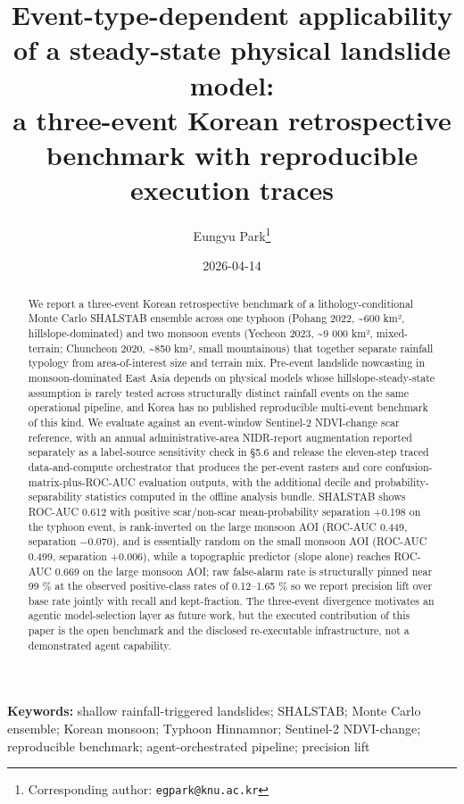 \documentclass[11pt,a4paper]{article}
\title{\bfseries Event-type-dependent applicability of a steady-state physical landslide model:\\ a three-event Korean retrospective benchmark with reproducible execution traces}
\author[1]{Eungyu Park\thanks{Corresponding author: \texttt{egpark@knu.ac.kr}}}
\affil[1]{Department of Geology, Kyungpook National University, Daegu, Republic of Korea}
\affil[ ]{\textit{In preparation for submission to} \textsc{Landslides} (Springer)}
\date{2026-04-14}
\begin{document}
\maketitle

\thispagestyle{empty}
\setcounter{page}{1}
\begin{abstract}
We report a three-event Korean retrospective benchmark of a lithology-conditional Monte Carlo SHALSTAB ensemble across one typhoon (Pohang 2022, \textasciitilde600 km², hillslope-dominated) and two monsoon events (Yecheon 2023, \textasciitilde9 000 km², mixed-terrain; Chuncheon 2020, \textasciitilde850 km², small mountainous) that together separate rainfall typology from area-of-interest size and terrain mix. Pre-event landslide nowcasting in monsoon-dominated East Asia depends on physical models whose hillslope-steady-state assumption is rarely tested across structurally distinct rainfall events on the same operational pipeline, and Korea has no published reproducible multi-event benchmark of this kind. We evaluate against an event-window Sentinel-2 NDVI-change scar reference, with an annual administrative-area NIDR-report augmentation reported separately as a label-source sensitivity check in §5.6 and release the eleven-step traced data-and-compute orchestrator that produces the per-event rasters and core confusion-matrix-plus-ROC-AUC evaluation outputs, with the additional decile and probability-separability statistics computed in the offline analysis bundle. SHALSTAB shows ROC-AUC 0.612 with positive scar/non-scar mean-probability separation +0.198 on the typhoon event, is rank-inverted on the large monsoon AOI (ROC-AUC 0.449, separation −0.070), and is essentially random on the small monsoon AOI (ROC-AUC 0.499, separation +0.006), while a topographic predictor (slope alone) reaches ROC-AUC 0.669 on the large monsoon AOI; raw false-alarm rate is structurally pinned near 99 \% at the observed positive-class rates of 0.12--1.65 \% so we report precision lift over base rate jointly with recall and kept-fraction. The three-event divergence motivates an agentic model-selection layer as future work, but the executed contribution of this paper is the open benchmark and the disclosed re-executable infrastructure, not a demonstrated agent capability.
\end{abstract}

\smallskip
\noindent\textbf{Keywords:} shallow rainfall-triggered landslides; SHALSTAB;
Monte Carlo ensemble; Korean monsoon; Typhoon Hinnamnor; Sentinel-2
NDVI-change; reproducible benchmark; agent-orchestrated pipeline;
precision lift
\end{document}
